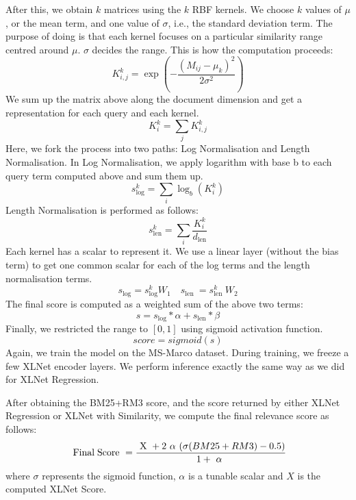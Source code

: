 \documentclass[10pt,twocolumn]{article}
\begin{document}
After this, we obtain $k$ matrices using the $k$ RBF kernels. We choose $k$ values of $\mu$, or the mean term, and one value of $\sigma$, i.e., the standard deviation term. The purpose of doing is that each kernel focuses on a particular similarity range centred around $\mu$. $\sigma$ decides the range. This is how the computation proceeds:
 \begin{equation}
     K_{i, j}^{k}=\exp \left(-\frac{\left(M_{i j}-\mu_{k}\right)^{2}}{2 \sigma^{2}}\right)
 \end{equation}
 We sum up the matrix above along the document dimension and get a representation for each query and each kernel.
\begin{equation}
      K_{i}^{k}=\sum_{j} K_{i, j}^{k}
\end{equation}
Here, we fork the process into two paths: Log Normalisation and Length Normalisation. In Log Normalisation, we apply logarithm with base b to each query term computed above and sum them up.
\begin{equation}
    s_{\log }^{k}=\sum_{i} \log _{b}\left(K_{i}^{k}\right)    \end{equation}
Length Normalisation is performed as follows:
\begin{equation}
    s_{\mathrm{len}}^{k}=\sum_{i} \frac{K_{i}^{k}}{d_{\mathrm{len}}}
\end{equation}
Each kernel has a scalar to represent it. We use a linear layer (without the bias term) to get one common scalar for each of the log terms and the length normalisation terms.
\begin{equation}
    s_{\log }=s_{\log }^{k} W_{1} \quad s_{\text {len }}=s_{\text {len }}^{k} W_{2}
\end{equation}
The final score is computed as a weighted sum of the above two terms:
\begin{equation}
    s=s_{\mathrm{log}} * \alpha+s_{\mathrm{len}} * \beta
\end{equation}
Finally, we restricted the range to $[0,1]$ using sigmoid activation function.
\begin{equation}
    score = sigmoid(s)
\end{equation}
Again, we train the model on the MS-Marco dataset. During training, we freeze a few XLNet encoder layers. We perform inference exactly the same way as we did for XLNet Regression.

After obtaining the BM25+RM3 score, and the score returned by either XLNet Regression or XLNet with Similarity, we compute the final relevance score as follows:
\begin{equation}
\text { Final\;Score }=\frac{ \text { X }+2\text { $\alpha$ } (\operatorname{\sigma}(B M 25+RM3)-0.5)}{1+\text { $\alpha$ }}
\end{equation}
where $\sigma$ represents the sigmoid function, $\alpha$ is a tunable scalar and $X$ is the computed XLNet Score.
\end{document}
